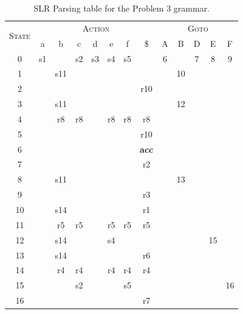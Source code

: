 \begin{table}[H]
\begin{center}
\begin{tabular}{c | cc cc cc c | cc cc c} %
	\hline \hline
	\multirow{2}{*}{\textsc{State}} & \multicolumn{7}{c|}{\textsc{Action}} & \multicolumn{5}{c}{\textsc{Goto}} \\ \cline{2-13}
	   & a  & b  & c  & d  & e  & f  & \$  & A  & B  & D  & E  & F  \\ \hline
	0  & s1 &    & s2 & s3 & s4 & s5 &     & 6  &    & 7  & 8  & 9  \\ 
	1  &    &s11 &    &    &    &    &     &    & 10 &    &    &    \\
	2  &    &    &    &    &    &    &r10  &    &    &    &    &    \\
	3  &    &s11 &    &    &    &    &     &    & 12 &    &    &    \\
	4  &    &r8  & r8 &    & r8 & r8 & r8  &    &    &    &    &    \\
	5  &    &    &    &    &    &    &r10  &    &    &    &    &    \\  
	6  &    &    &    &    &    &    & \textbf{acc} & & & &    &    \\  
	7  &    &    &    &    &    &    &r2   &    &    &    &    &    \\ 
	8  &    &s11 &    &    &    &    &     &    & 13 &    &    &    \\ 
	9  &    &    &    &    &    &    & r3  &    &    &    &    &    \\
    10 &    & s14&    &    &    &    & r1  &    &    &    &    &    \\
	11 &    & r5 &r5  &    &r5  &r5  &r5   &    &    &    &    &    \\
	12 &    &s14 &    &    &s4  &    &     &    &    &    & 15 &    \\
	13 &    &s14 &    &    &    &    &r6   &    &    &    &    &    \\
	14 &    &r4  &r4  &    &r4  &r4  &r4   &    &    &    &    &    \\
	15 &    &    &s2  &    &    &s5  &     &    &    &    &    &16  \\
	16 &    &    &    &    &    &    &r7   &    &    &    &    &    \\
\end{tabular}
\end{center}
\caption{SLR Parsing table for the Problem 3 grammar.}
\label{tab:1-3-b}
\end{table}



